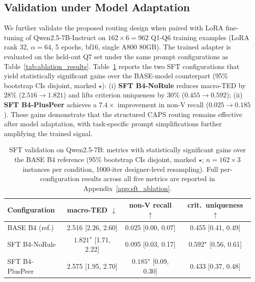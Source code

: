 
\subsection{Validation under Model Adaptation}
\label{sec:sft_validation}

We further validate the proposed routing design when paired with LoRA fine-tuning of
Qwen2.5-7B-Instruct on $162 \times 6 = 962$ Q1-Q6 training examples (LoRA rank 32,
$\alpha = 64$, 5 epochs, bf16, single A800 80GB). The trained adapter is evaluated on the
held-out Q7 set under the same prompt configurations as Table~\ref{tab:ablation_results}.
Table~\ref{tab:sft_results} reports the two SFT configurations that yield statistically
significant gains over the BASE-model counterpart (95\% bootstrap CIs disjoint, marked
$\star$): (i) \textbf{SFT B4-NoRule} reduces macro-TED by $28\%$ ($2.516 \rightarrow 1.821$)
and lifts criterion uniqueness by $30\%$ ($0.455 \rightarrow 0.592$); (ii) \textbf{SFT
B4-PlusPeer} achieves a $7.4\times$ improvement in non-V recall ($0.025 \rightarrow 0.185$).
These gains demonstrate that the structured CAPS routing remains effective after model
adaptation, with task-specific prompt simplifications further amplifying the trained signal.

\begin{table}[t]
\centering
\small
\caption{SFT validation on Qwen2.5-7B: metrics with statistically significant gains over the BASE B4 reference (95\% bootstrap CIs disjoint, marked $\star$; $n = 162 \times 3$ instances per condition, 1000-iter designer-level resampling). Full per-configuration results across all five metrics are reported in Appendix~\ref{app:sft_ablation}.}
\label{tab:sft_results}
\begin{tabular*}{\linewidth}{l @{\extracolsep{\fill}} ccc}
\toprule
\textbf{Configuration} & \textbf{macro-TED} $\downarrow$ & \textbf{non-V recall} $\uparrow$ & \textbf{crit.\ uniqueness} $\uparrow$ \\
\midrule
BASE B4 (ref.)   & 2.516 \scriptsize{[2.26, 2.60]} & 0.025 \scriptsize{[0.00, 0.07]} & 0.455 \scriptsize{[0.41, 0.49]} \\
SFT B4-NoRule    & $\mathbf{1.821}^{\star}$ \scriptsize{[1.71, 2.22]} & 0.095 \scriptsize{[0.03, 0.17]} & $\mathbf{0.592}^{\star}$ \scriptsize{[0.56, 0.61]} \\
SFT B4-PlusPeer  & 2.575 \scriptsize{[1.95, 2.70]} & $\mathbf{0.185}^{\star}$ \scriptsize{[0.09, 0.30]} & 0.433 \scriptsize{[0.37, 0.48]} \\
\bottomrule
\end{tabular*}
\end{table}

